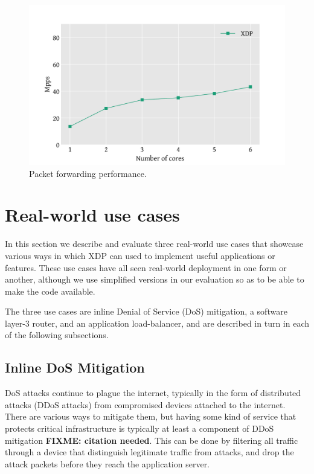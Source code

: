 \documentclass[10pt,sigconf]{acmart}
\begin{document}
\begin{figure}[t]
\centering
\includegraphics[width=\linewidth]{figures/redirect-test.pdf}
\caption{\label{fig:redirect-test} Packet forwarding performance.}
\end{figure}

\section{Real-world use cases}
\label{sec:usecases}
In this section we describe and evaluate three real-world use cases that
showcase various ways in which XDP can used to implement useful applications or
features. These use cases have all seen real-world deployment in one form or
another, although we use simplified versions in our evaluation so as to be able
to make the code available.

The three use cases are inline Denial of Service (DoS) mitigation, a software
layer-3 router, and an application load-balancer, and are described in turn in
each of the following subsections.

\subsection{Inline DoS Mitigation}
\label{sec:dos-usecase}
DoS attacks continue to plague the internet, typically in the form of
distributed attacks (DDoS attacks) from compromised devices attached to the
internet. There are various ways to mitigate them, but having some kind of
service that protects critical infrastructure is typically at least a component
of DDoS mitigation \textbf{FIXME: citation needed}. This can be done by
filtering all traffic through a device that distinguish legitimate traffic from
attacks, and drop the attack packets before they reach the application server.
\end{document}
